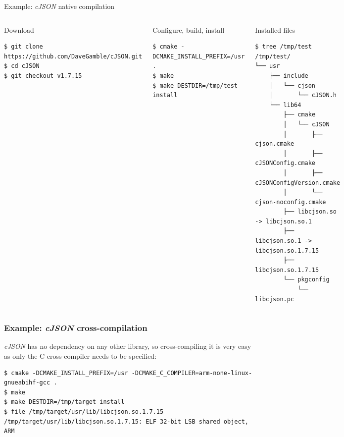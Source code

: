 \begin{frame}[fragile]{Example: {\em cJSON} native compilation}

  \begin{columns}
    \begin{block}{Download}
      {\tiny
\begin{verbatim}
$ git clone https://github.com/DaveGamble/cJSON.git
$ cd cJSON
$ git checkout v1.7.15
\end{verbatim}
      }
    \end{block}

    \begin{block}{Configure, build, install}
      {\tiny
\begin{verbatim}
$ cmake -DCMAKE_INSTALL_PREFIX=/usr .
$ make
$ make DESTDIR=/tmp/test install
\end{verbatim}
      }
    \end{block}
    \begin{block}{Installed files}
      {\tiny
\begin{verbatim}
$ tree /tmp/test
/tmp/test/
└── usr
    ├── include
    │   └── cjson
    │       └── cJSON.h
    └── lib64
        ├── cmake
        │   └── cJSON
        │       ├── cjson.cmake
        │       ├── cJSONConfig.cmake
        │       ├── cJSONConfigVersion.cmake
        │       └── cjson-noconfig.cmake
        ├── libcjson.so -> libcjson.so.1
        ├── libcjson.so.1 -> libcjson.so.1.7.15
        ├── libcjson.so.1.7.15
        └── pkgconfig
            └── libcjson.pc
\end{verbatim}
      }
    \end{block}
  \end{columns}
\end{frame}

\begin{frame}[fragile]
  \frametitle{Example: {\em cJSON} cross-compilation}
  {\em cJSON} has no dependency on any other library, so
  cross-compiling it is very easy as only the C cross-compiler needs
  to be specified:
  \begin{block}{}
    {\scriptsize
\begin{verbatim}
$ cmake -DCMAKE_INSTALL_PREFIX=/usr -DCMAKE_C_COMPILER=arm-none-linux-gnueabihf-gcc .
$ make
$ make DESTDIR=/tmp/target install
$ file /tmp/target/usr/lib/libcjson.so.1.7.15
/tmp/target/usr/lib/libcjson.so.1.7.15: ELF 32-bit LSB shared object, ARM
\end{verbatim}
    }
  \end{block}
\end{frame}

